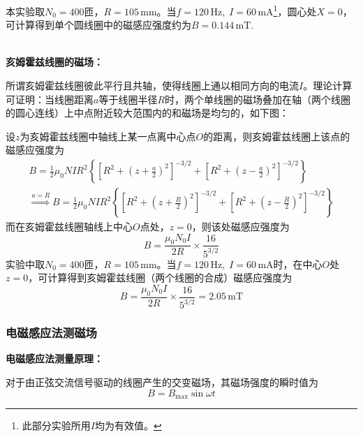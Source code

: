 \documentclass[UTF8]{article}
\theoremstyle{MyLineTheoremStyle} %
\theoremstyle{MyBlockTheoremStyle} %
\theoremstyle{MySubsubsectionStyle} %
\begin{document}
本实验取$ N_0=400 $匝，$ R=105\,\mathrm{mm} $。当$ f=120\,\mathrm{Hz},\;I=60\,\mathrm{mA} $\footnote{此部分实验所用$ I $均为有效值。}，圆心处$ X=0 $，可计算得到单个圆线圈中的磁感应强度约为$ B=0.144\,\mathrm{mT} $.

~\\
\noindent \textbf{亥姆霍兹线圈的磁场：}\par
所谓亥姆霍兹线圈彼此平行且共轴，使得线圈上通以相同方向的电流$ I $。理论计算可证明：当线圈距离$ a $等于线圈半径$ R $时，两个单线圈的磁场叠加在轴（两个线圈的圆心连线）上中点附近较大范围内的和磁场是均匀的，如下图：

设$ z $为亥姆霍兹线圈中轴线上某一点离中心点$ O $的距离，则亥姆霍兹线圈上该点的磁感应强度为
\begin{gather}
B=\frac12\mu_0NIR^2\left\{\left[R^2+\left(z + \frac{a}{2}\right)^2\right]^{-3/2}+\left[R^2+\left(z - \frac{a}{2}\right)^2\right]^{-3/2}\right\} \\ 
\overset{a = R}{\Longrightarrow}
B=\frac12\mu_0NIR^2\left\{\left[R^2+\left(z + \frac{R}{2}\right)^2\right]^{-3/2}+\left[R^2+\left(z - \frac{R}{2}\right)^2\right]^{-3/2}\right\} 
\end{gather}
而在亥姆霍兹线圈轴线上中心$ O $点处，$ z=0 $，则该处磁感应强度为
\begin{equation}
B=\frac{\mu_0N_0I}{2R}\times\frac{16}{5^{3/2}}
\end{equation}
实验中取$ N_0=400 $匝，$ R=105\,\mathrm{mm} $。当$ f=120\,\mathrm{Hz},\;I=60\,\mathrm{mA} $时，在中心$ O $处$ z=0 $，可计算得到亥姆霍兹线圈（两个线圈的合成）磁感应强度为
\begin{equation}
B=\frac{\mu_0N_0I}{2R}\times\frac{16}{5^{3/2}}=2.05\,\mathrm{mT}
\end{equation}

\newpage
\subsubsection{电磁感应法测磁场}
\noindent \textbf{电磁感应法测量原理：}\par
对于由正弦交流信号驱动的线圈产生的交变磁场，其磁场强度的瞬时值为
\begin{equation}
B=B_{\max}\sin\omega t
\end{equation}
\end{document}
